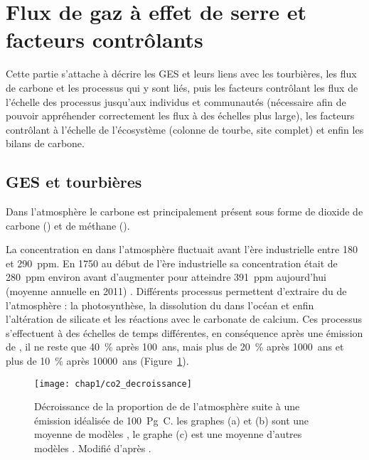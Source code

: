 
\section{Flux de gaz à effet de serre et facteurs contrôlants}

Cette partie s'attache à décrire les GES et leurs liens avec les tourbières, les flux de carbone et les processus qui y sont liés, puis les facteurs contrôlant les flux de l'échelle des processus jusqu'aux individus et communautés (nécessaire afin de pouvoir appréhender correctement les flux à des échelles plus large), les facteurs contrôlant à l'échelle de l'écosystème (colonne de tourbe, site complet) et enfin les bilans de carbone.


\subsection{GES et tourbières}

Dans l'atmosphère le carbone est principalement présent sous forme de dioxide de carbone (\coo) et de méthane (\chh).

La concentration en \coo dans l'atmosphère fluctuait avant l'ère industrielle entre 180 et \SI{290}{ppm}.
En 1750 au début de l'ère industrielle sa concentration était de \SI{280}{ppm} environ avant d'augmenter pour atteindre \SI{391}{ppm} aujourd'hui (moyenne annuelle en 2011) \citep{Ciais2014}.
Différents processus permettent d'extraire du \coo de l'atmosphère : la photosynthèse, la dissolution du \coo dans l'océan et enfin l'altération de silicate et les réactions avec le carbonate de calcium.
Ces processus s'effectuent à des échelles de temps différentes, en conséquence après une émission de \coo, il ne reste que \SI{40}{\percent} après \SI{100}{ans}, mais plus de \SI{20}{\percent} après \SI{1000}{ans} et plus de \SI{10}{\percent} après \SI{10000}{ans} \citep{joos2013,Ciais2014} (Figure~\ref{fig:co2_decroissance}).

\begin{figure}
\centering
\texttt{[image: chap1/co2\_decroissance]}
\caption{Décroissance de la proportion de \coo de l'atmosphère suite à une émission idéalisée de \SI{100}{\peta\gram C}. les graphes (a) et (b) sont une moyenne de modèles \citep{joos2013}, le graphe (c) est une moyenne d'autres modèles \citep{archer2009}. Modifié d'après \citep{Ciais2014}.}
\label{fig:co2_decroissance}
\end{figure}


